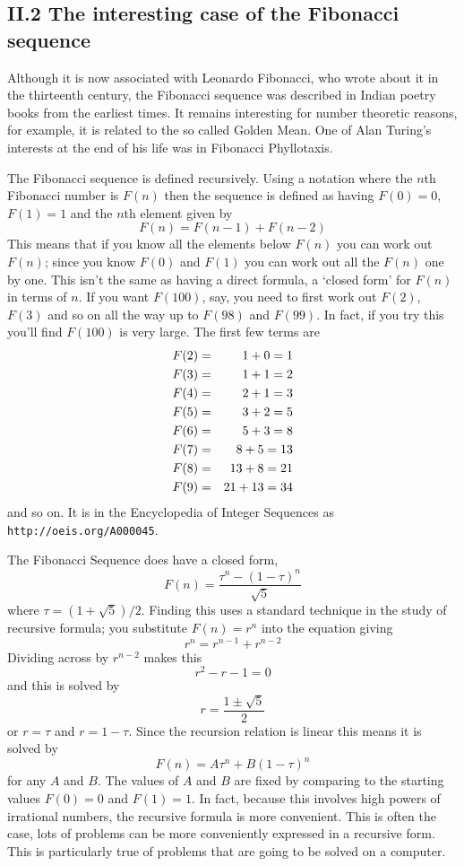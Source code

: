 \documentclass[11pt,a4paper]{scrartcl}
\begin{document}
\subsection*{II.2 The interesting case of the Fibonacci sequence}

Although it is now associated with Leonardo Fibonacci, who wrote about
it in the thirteenth century, the Fibonacci sequence was described in
Indian poetry books from the earliest times. It remains interesting
for number theoretic reasons, for example, it is related to the so
called Golden Mean. One of Alan Turing's interests at the end of his
life was in Fibonacci Phyllotaxis.

The Fibonacci sequence is defined recursively. Using a notation where
the $n$th Fibonacci number is $F(n)$ then the sequence is defined as
having $F(0)=0$, $F(1)=1$ and the $n$th element given by
\begin{equation}
F(n)=F(n-1)+F(n-2)
\end{equation}
This means that if you know all the elements below $F(n)$ you can work
out $F(n)$; since you know $F(0)$ and $F(1)$ you can work out all the
$F(n)$ one by one. This isn't the same as having a direct formula, a
\lq{}closed form\rq{} for $F(n)$ in terms of $n$. If you want
$F(100)$, say, you need to first work out $F(2)$, $F(3)$ and so on all
the way up to $F(98)$ and $F(99)$. In fact, if you try this you'll
find $F(100)$ is very large. The first few terms are
\begin{eqnarray}
F(2)&=&1+0=1\cr
F(3)&=&1+1=2\cr
F(4)&=&2+1=3\cr
F(5)&=&3+2=5\cr
F(6)&=&5+3=8\cr
F(7)&=&8+5=13\cr
F(8)&=&13+8=21\cr
F(9)&=&21+13=34
\end{eqnarray}
and so on. It is in the Encyclopedia of Integer Sequences as {\tt
  http://oeis.org/A000045}. 

The Fibonacci Sequence does have a closed form,
\begin{equation}
F(n)=\frac{\tau^n-(1-\tau)^n}{\sqrt{5}}
\end{equation}
where $\tau=(1+\sqrt{5})/2$. Finding this uses a standard technique in
the study of recursive formula; you substitute $F(n)=r^n$ into the
equation giving
\begin{equation}
r^n=r^{n-1}+r^{n-2}
\end{equation}
Dividing across by $r^{n-2}$ makes this
\begin{equation}
r^2-r-1=0
\end{equation}
and this is solved by
\begin{equation}
r=\frac{1\pm\sqrt{5}}{2}
\end{equation}
or $r=\tau$ and $r=1-\tau$. Since the recursion relation is linear
this means it is solved by
\begin{equation}
F(n)=A \tau^n + B (1-\tau)^n
\end{equation}
for any $A$ and $B$. The values of $A$ and $B$ are fixed by comparing
to the starting values $F(0)=0$ and $F(1)=1$. In fact, because this
involves high powers of irrational numbers, the recursive formula is
more convenient. This is often the case, lots of problems can be more
conveniently expressed in a recursive form. This is particularly true
of problems that are going to be solved on a computer.
\end{document}
